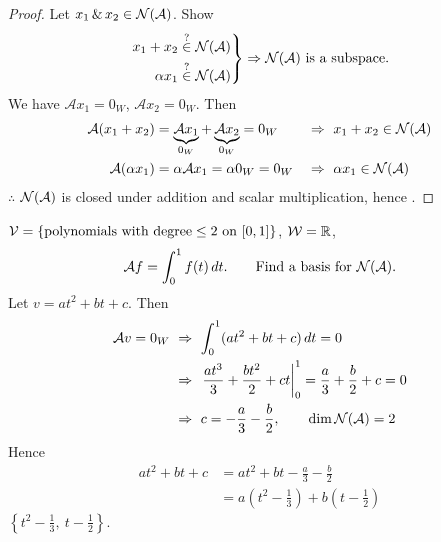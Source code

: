 \begin{center}
\end{center}
\begin{proof}
Let $x_1 \,\&\, x_2\in\mathcal{N}(\mathcal{A})$. Show
\[
\left.\begin{aligned}
x_1+x_2 &\overset{?}{\in}\mathcal{N}(\mathcal{A})\\
\alpha x_1 &\overset{?}{\in}\mathcal{N}(\mathcal{A})
\end{aligned}\right\}
\Rightarrow \mathcal{N}(\mathcal{A}) \text{ is a subspace.}
\]
We have $\mathcal{A}x_1=0_W$, $\mathcal{A}x_2=0_W$. Then
\begin{align*}
\mathcal{A}(x_1+x_2) &= \underbrace{\mathcal{A}x_1}_{0_W}+\underbrace{\mathcal{A}x_2}_{0_W}=0_W &&\Rightarrow\ x_1+x_2\in\mathcal{N}(\mathcal{A})\\*
\mathcal{A}(\alpha x_1) &= \alpha\mathcal{A}x_1=\alpha 0_W=0_W &&\Rightarrow\ \alpha x_1\in\mathcal{N}(\mathcal{A})
\end{align*}
$\therefore$ $\mathcal{N}(\mathcal{A})$ is closed under addition and scalar multiplication, hence .
\end{proof}

\begin{example}
$\mathcal{V}=\{\text{polynomials with degree}\le 2 \text{ on } [0,1]\}$, \quad $\mathcal{W}=\mathbb{R}$,
\[
\mathcal{A}f=\int_0^1 f(t)\,dt. \qquad\text{Find a basis for } \mathcal{N}(\mathcal{A}).
\]
Let $v=at^2+bt+c$. Then
\begin{align*}
\mathcal{A}v=0_W \ &\Rightarrow\ \int_0^1(at^2+bt+c)\,dt=0\\
&\Rightarrow\ \left.\frac{at^3}{3}+\frac{bt^2}{2}+ct\right|_0^1=\frac a3+\frac b2+c=0\\
&\Rightarrow\ c=-\frac a3-\frac b2, \qquad \dim\Null(\mathcal{A})=2
\end{align*}
Hence
\begin{align*}
at^2+bt+c &= at^2+bt-\frac a3-\frac b2\\
&= a\left(t^2-\frac13\right)+b\left(t-\frac12\right)
\end{align*}
 $\left\{t^2-\frac13,\ t-\frac12\right\}$.
\end{example}

